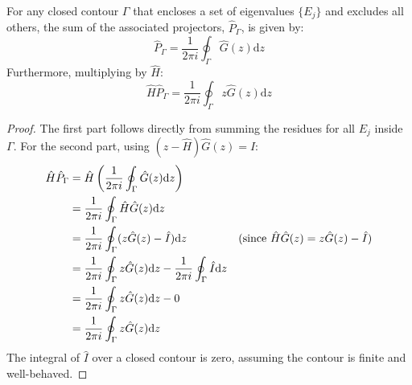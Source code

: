 \begin{theorem}
  For any closed contour $\Gamma$ that encloses a set of
  eigenvalues $\{E_j\}$ and excludes all
  others, the sum of the associated projectors, $\hat P_\Gamma$, is given by:
  \begin{equation} \label{eq:projector_contour_integral}
    \hat P_\Gamma=\frac{1}{2\pi i}\oint_{\Gamma} \hat G(z)\mathrm dz
  \end{equation}
  Furthermore, multiplying by $\hat H$:
  \begin{equation} \label{eq:H_projector_contour_integral}
    \hat H \hat P_\Gamma= \frac{1}{2\pi i}\oint_{\Gamma} z\hat
    G(z)\mathrm dz
  \end{equation}
\end{theorem}
\begin{proof}
  The first part follows directly from summing the residues for all
  $E_j$ inside $\Gamma$.
  For the second part, using $(z-\hat H)\hat G(z) = \hat I$:
  \begin{align}
    \hat H \hat P_\Gamma &= \hat H \left(\frac{1}{2\pi
    i}\oint_{\Gamma} \hat G(z)\mathrm dz\right) \\
    &= \frac{1}{2\pi i}\oint_{\Gamma} \hat H \hat G(z)\mathrm dz \notag \\
    &= \frac{1}{2\pi i}\oint_{\Gamma} (z\hat G(z) - \hat
    I)\mathrm dz \quad &\text{(since } \hat H \hat G(z) = z\hat
    G(z) - \hat I \text{)} \notag \\
    &= \frac{1}{2\pi i}\oint_{\Gamma} z\hat G(z)\mathrm dz -
    \frac{1}{2\pi i}\oint_{\Gamma} \hat I \mathrm dz \notag \\
    &= \frac{1}{2\pi i}\oint_{\Gamma} z\hat G(z)\mathrm dz - 0 \notag \\
    &= \frac{1}{2\pi i}\oint_{\Gamma} z\hat G(z)\mathrm dz \notag
  \end{align}
  The integral of $\hat I$ over a closed contour is zero, assuming
  the contour is finite and well-behaved.
\end{proof}

